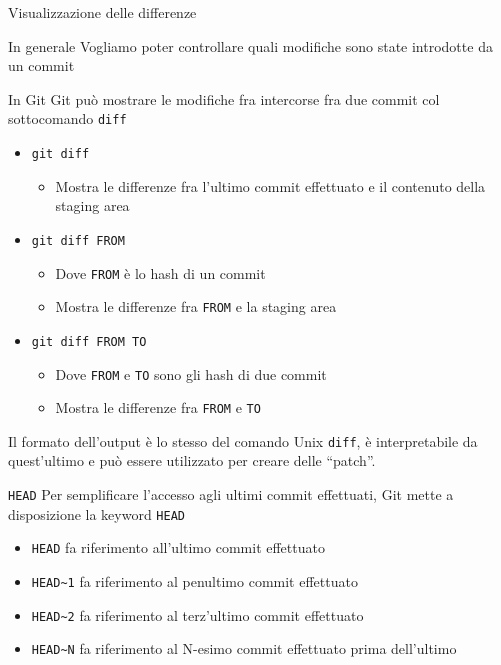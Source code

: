 \documentclass[presentation]{beamer}
\begin{document}
\begin{frame}{Visualizzazione delle differenze}
	\begin{block}{In generale}
		Vogliamo poter controllare quali modifiche sono state introdotte da un commit
	\end{block}
	\begin{block}{In Git}
		Git può mostrare le modifiche fra intercorse fra due commit col sottocomando \texttt{diff}
		\begin{itemize}
			\item \texttt{git diff}
			\begin{itemize}
				\item Mostra le differenze fra l'ultimo commit effettuato e il contenuto della staging area
			\end{itemize}
			\item \texttt{git diff FROM}
			\begin{itemize}
				\item Dove \texttt{FROM} è lo hash di un commit
				\item Mostra le differenze fra \texttt{FROM} e la staging area
			\end{itemize}
			\item \texttt{git diff FROM TO}
			\begin{itemize}
				\item Dove \texttt{FROM} e \texttt{TO} sono gli hash di due commit
				\item Mostra le differenze fra \texttt{FROM} e \texttt{TO}
			\end{itemize}
		\end{itemize}
		Il formato dell'output è lo stesso del comando Unix \texttt{diff}, è interpretabile da quest'ultimo e può essere utilizzato per creare delle ``patch''.
	\end{block}
	\begin{block}{\texttt{HEAD}}
		Per semplificare l'accesso agli ultimi commit effettuati, Git mette a disposizione la keyword \texttt{HEAD}
		\begin{itemize}
			\item \texttt{HEAD} fa riferimento all'ultimo commit effettuato
			\item \texttt{HEAD\textasciitilde{}1} fa riferimento al penultimo commit effettuato
			\item \texttt{HEAD\textasciitilde{}2} fa riferimento al terz'ultimo commit effettuato
			\item \texttt{HEAD\textasciitilde{}N} fa riferimento al N-esimo commit effettuato prima dell'ultimo

\end{itemize}
\end{block}
\end{frame}
\end{document}
